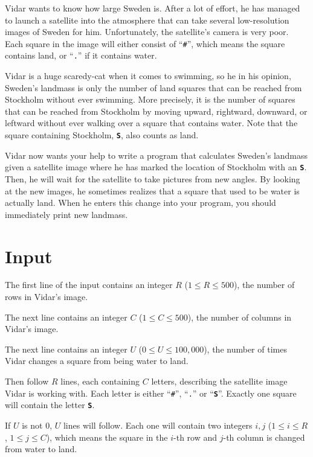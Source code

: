 Vidar wants to know how large Sweden is. After a lot of effort, he has managed to launch a satellite into the atmosphere that can take several low-resolution
images of Sweden for him. Unfortunately, the satellite's camera is very poor. Each square in the image will either consist of ``\texttt{\#}'',
which means the square contains land, or ``\texttt{.}'' if it contains water.

Vidar is a huge scaredy-cat when it comes to swimming, so he in his opinion, Sweden's landmass is only the number of land squares that can be
reached from Stockholm without ever swimming. More precisely, it is the number of squares that can be reached from Stockholm by moving upward,
rightward, downward, or leftward without ever walking over a square that contains water. Note that the square containing Stockholm,
\textbf{\texttt{S}}, also counts as land.

Vidar now wants your help to write a program that calculates Sweden's landmass given a satellite image where he has marked the location of
Stockholm with an \textbf{\texttt{S}}. Then, he will wait for the satellite to take pictures from new angles. By looking at the new images,
he sometimes realizes that a square that used to be water is actually land. When he enters this change into your program, you should
immediately print new landmass.

\section*{Input}
The first line of the input contains an integer $R$ ($1 \le R \le 500$), the number of rows in Vidar's image.

The next line contains an integer $C$ ($1 \le C \le 500$), the number of columns in Vidar's image.

The next line contains an integer $U$ ($0 \le U \le 100,000$), the number of times Vidar changes a square from being water to land.

Then follow $R$ lines, each containing $C$ letters, describing the satellite image Vidar is working with. Each letter is either
``\texttt{\#}'', ``\texttt{.}'' or ``\textbf{\texttt{S}}''. Exactly one square will contain the letter \textbf{\texttt{S}}.

If $U$ is not 0, $U$ lines will follow. Each one will contain two integers $i, j$ ($1 \le i \le R$, $1 \le j \le C$),
which means the square in the $i$-th row and $j$-th column is changed from water to land.

